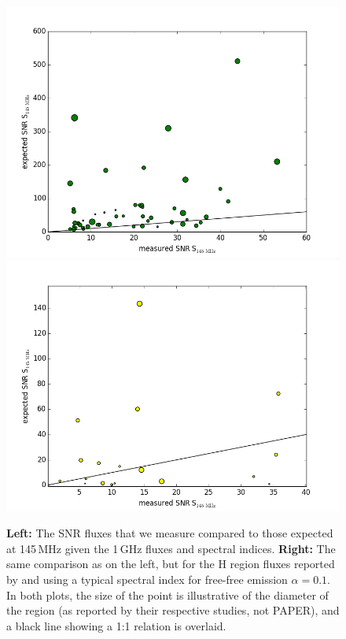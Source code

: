\documentclass[useAMS,usenatbib]{mn2e}
\begin{document}
\begin{figure}
\centering
\includegraphics[scale=.4]{GreenScatter.png}
\includegraphics[scale=.4]{PaladiniScatter.png}
\caption{\textbf{Left:} The SNR fluxes that we measure compared to those expected at 145\,MHz given the \protect\citealt{DAGreen.14} 1\,GHz fluxes and spectral indices. \textbf{Right:} The same comparison as on the left, but for the H{} region fluxes reported by \protect\citealt{Paladini.03} and using a typical spectral index for free-free emission $\alpha=0.1$. In both plots, the size of the point is illustrative of the diameter of the region (as reported by their respective studies, not PAPER), and a black line showing a 1:1 relation is overlaid.}
\label{fig:comparisonscatters}
\end{figure}
\end{document}
